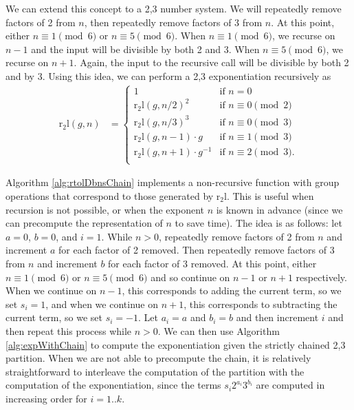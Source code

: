 \documentclass{ucalgthes1}
\theoremstyle{definition}
\begin{document}
We can extend this concept to a 2,3 number system.  We will repeatedly remove factors of 2 from $n$, then repeatedly remove factors of 3 from $n$.  At this point, either $n \equiv 1 \pmod 6$ or $n \equiv 5 \pmod 6$.  When $n \equiv 1 \pmod 6$, we recurse on $n-1$ and the input will be divisible by both 2 and 3.  When $n \equiv 5 \pmod 6$, we recurse on $n+1$.  Again, the input to the recursive call will be divisible by both 2 and by 3.  Using this idea, we can perform a 2,3 exponentiation recursively as
\newcommand{\rtol}{\textrm{r}_2\textrm{l}}
\begin{align*}
\rtol(g, n) &= \begin{cases}
               1 & \textrm{if $n = 0$} \\
               {\rtol(g, n/2)}^2 & \textrm{if $n \equiv 0 \pmod 2$} \\
               {\rtol(g, n/3)}^3 & \textrm{if $n \equiv 0 \pmod 3$} \\
               \rtol(g, n-1) \cdot g & \textrm{if $n \equiv 1 \pmod 3$} \\
               \rtol(g, n+1) \cdot g^{-1} & \textrm{if $n \equiv 2 \pmod 3$}. \\
	       \end{cases}
\end{align*}

Algorithm \ref{alg:rtolDbnsChain} implements a non-recursive function with group operations that correspond to those generated by $\rtol$. This is useful when recursion is not possible, or when the exponent $n$ is known in advance (since we can precompute the representation of $n$ to save time).  The idea is as follows: let $a = 0$, $b=0$, and $i=1$.  While $n > 0$, repeatedly remove factors of 2 from $n$ and increment $a$ for each factor of 2 removed. Then repeatedly remove factors of 3 from $n$ and increment $b$ for each factor of 3 removed. At this point, either $n \equiv 1 \pmod 6$ or $n \equiv 5 \pmod 6$ and so continue on $n-1$ or $n+1$ respectively.  When we continue on $n-1$, this corresponds to adding the current term, so we set $s_i=1$, and when we continue on $n+1$, this corresponds to subtracting the current term, so we set $s_i=-1$. Let $a_i = a$ and $b_i = b$ and then increment $i$ and then repeat this process while $n > 0$.  We can then use Algorithm \ref{alg:expWithChain} to compute the exponentiation given the strictly chained 2,3 partition. When we are not able to precompute the chain, it is relatively straightforward to interleave the computation of the partition with the computation of the exponentiation, since the terms $s_i2^{a_i}3^{b_i}$ are computed in increasing order for $i=1..k$.
\end{document}
